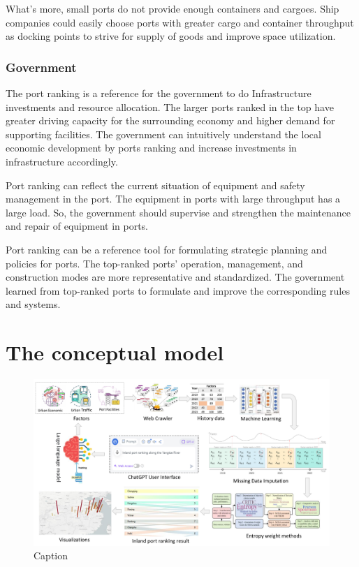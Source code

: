 \documentclass[preprint]{elsarticle}
\begin{document}
What's more, small ports do not provide enough containers and cargoes. Ship companies could easily choose ports with greater cargo and container throughput as docking points to strive for supply of goods and improve space utilization.
 \subsubsection{Government}

The port ranking is a reference for the government to do Infrastructure investments and resource allocation. The larger ports ranked in the top have greater driving capacity for the surrounding economy and higher demand for supporting facilities. The government can intuitively understand the local economic development by ports ranking and increase investments in infrastructure accordingly.

Port ranking can reflect the current situation of equipment and safety management in the port. The equipment in ports with large throughput has a large load. So, the government should supervise and strengthen the maintenance and repair of equipment in ports.

Port ranking can be a reference tool for formulating strategic planning and policies for ports. The top-ranked ports' operation, management, and construction modes are more representative and standardized. The government learned from top-ranked ports to formulate and improve the corresponding rules and systems.

\section{The conceptual model}
\begin{figure}[H]
    \centering
    \includegraphics[width=1.0\textwidth]{autoportranking.pdf}
    \caption{Caption}
    \label{fig:enter-label}
\end{figure}
\end{document}
